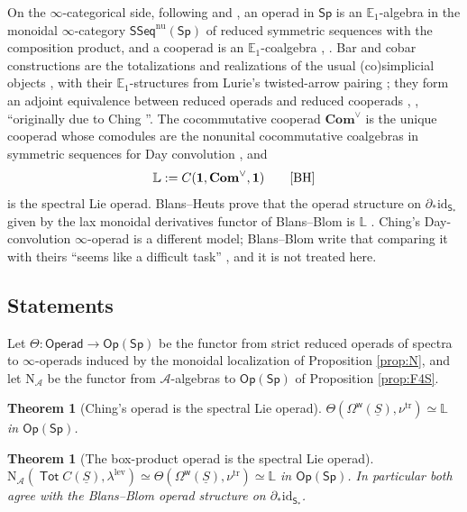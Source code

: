 \documentclass[11pt]{amsart}
\newtheorem{theorem}[subsection]{Theorem}
\theoremstyle{definition}
\theoremstyle{remark}
\newcommand{\Sp}{\mathsf{Sp}}
\newcommand{\Tot}{\operatorname{\mathsf{Tot}}}
\newcommand{\SSeq}{\mathsf{SSeq}}
\newcommand{\Op}{\mathsf{Op}}
\newcommand{\id}{\mathrm{id}}
\newcommand{\uS}{\underline{S}}
\newcommand{\Omw}{\Omega^{\mathsf{w}}}
\newcommand{\Aop}{\mathcal{A}}
\newcommand{\Lie}{\mathbb{L}}
\newcommand{\Comv}{\mathbf{Com}^{\vee}}
\newcommand{\unit}{\mathbf{1}}
\newcommand{\Lev}{\mathrm{lev}}
\newcommand{\tr}{\mathrm{tr}}
\newcommand{\Nfun}{\mathrm{N}}
\newcommand{\Th}{\Theta}
\begin{document}
On the $\infty$-categorical side, following \cite{BH} and \cite{HeKD}, an operad in $\Sp$ is an $\mathbb{E}_1$-algebra in the monoidal $\infty$-category $\SSeq^{\mathrm{nu}}(\Sp)$ of reduced symmetric sequences with the composition product, and a cooperad is an $\mathbb{E}_1$-coalgebra \cite[Definition 2.2]{BH}, \cite[Definition 3.2]{HeKD}. Bar and cobar constructions are the totalizations and realizations of the usual (co)simplicial objects \cite[Definition 2.13]{BH}, with their $\mathbb{E}_1$-structures from Lurie's twisted-arrow pairing \cite[Theorem 5.2.2.17]{HA}; they form an adjoint equivalence between reduced operads and reduced cooperads \cite[Proposition 2.14]{BH}, \cite[Theorem 3.4]{HeKD}, ``originally due to Ching \cite{Ch12}''. The cocommutative cooperad $\Comv$ is the unique cooperad whose comodules are the nonunital cocommutative coalgebras in symmetric sequences for Day convolution \cite[Proposition 2.11, Definition 2.12]{BH}, and
\[ \Lie := C(\unit,\Comv,\unit) \qquad\text{\cite[Definition 2.15]{BH}} \]
is the spectral Lie operad. Blans--Heuts prove that the operad structure on $\partial_*\id_{\mathsf{S}_*}$ given by the lax monoidal derivatives functor of Blans--Blom \cite[Theorem 3.3.2]{BB} is $\Lie$ \cite[Example 3.3, Corollary 5.9]{BH}. Ching's Day-convolution $\infty$-operad \cite{Ch21} is a different model; Blans--Blom write that comparing it with theirs ``seems like a difficult task'' \cite[\S 1.3]{BB}, and it is not treated here.

\subsection{Statements}
Let $\Th\colon \mathsf{Operad}\to\Op(\Sp)$ be the functor from strict reduced operads of spectra to $\infty$-operads induced by the monoidal localization of Proposition \ref{prop:N}, and let $\Nfun_{\Aop}$ be the functor from $\Aop$-algebras to $\Op(\Sp)$ of Proposition \ref{prop:F4S}.

\begin{theorem}[Ching's operad is the spectral Lie operad]\label{thm:A}
$\Th(\Omw(\uS),\nu^{\tr})\simeq\Lie$ in $\Op(\Sp)$.
\end{theorem}

\begin{theorem}[The box-product operad is the spectral Lie operad]\label{thm:B}
$\Nfun_{\Aop}(\Tot C(\uS),\lambda^{\Lev})\simeq\Th(\Omw(\uS),\nu^{\tr})\simeq\Lie$ in $\Op(\Sp)$. In particular both agree with the Blans--Blom operad structure on $\partial_*\id_{\mathsf{S}_*}$.
\end{theorem}
\end{document}
